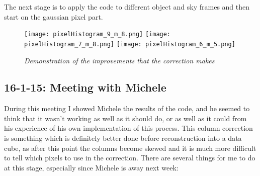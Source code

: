 \documentclass{literature}
\begin{document}
The next stage is to apply the code to different object and sky frames and then start on the gaussian pixel part. \\

\begin{figure}[!htp]
\centering
\texttt{[image: pixelHistogram\_9\_m\_8.png]}
\texttt{[image: pixelHistogram\_7\_m\_8.png]}
\texttt{[image: pixelHistogram\_6\_m\_5.png]}
\caption{\footnotesize{\emph{Demonstration of the improvements that the correction makes}}}
\label{fig:pix_histo1}
\end{figure}

\subsection{16-1-15: Meeting with Michele}
During this meeting I showed Michele the results of the code, and he seemed to think that it wasn't working as well as it should do, or as well as it could from his experience of his own implementation of this process. This column correction is something which is definitely better done before reconstruction into a data cube, as after this point the columns become skewed and it is much more difficult to tell which pixels to use in the correction. There are several things for me to do at this stage, especially since Michele is away next week: 
\end{document}
